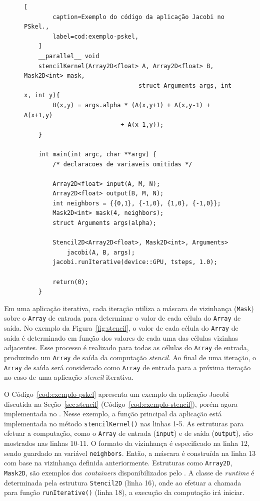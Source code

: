 \begin{figure}[t]
	\begin{lstlisting}[
		caption=Exemplo do código da aplicação Jacobi no PSkel.,
		label=cod:exemplo-pskel,
	]
	__parallel__ void
	stencilKernel(Array2D<float> A, Array2D<float> B, Mask2D<int> mask,
								struct Arguments args, int x, int y){
		B(x,y) = args.alpha * (A(x,y+1) + A(x,y-1) + A(x+1,y)
                           + A(x-1,y));
	}

	int main(int argc, char **argv) {
		/* declaracoes de variaveis omitidas */

		Array2D<float> input(A, M, N);
		Array2D<float> output(B, M, N);
		int neighbors = {{0,1}, {-1,0}, {1,0}, {-1,0}};
		Mask2D<int> mask(4, neighbors);
		struct Arguments args(alpha);

		Stencil2D<Array2D<float>, Mask2D<int>, Arguments>
			jacobi(A, B, args);
		jacobi.runIterative(device::GPU, tsteps, 1.0);

		return(0);
	}
\end{lstlisting}
\end{figure}

Em uma aplicação \stencil iterativa, cada iteração utiliza a máscara de
vizinhança (\texttt{Mask}) sobre o \texttt{Array} de entrada para determinar o
valor de cada célula do \texttt{Array} de saída. No exemplo da
Figura~\ref{fig:stencil}, o valor de cada célula do \texttt{Array} de saída é
determinado em função dos valores de cada uma das células vizinhas adjacentes.
Esse processo é realizado para todas as células do \texttt{Array} de entrada,
produzindo um \texttt{Array} de saída da computação \textit{stencil}. Ao final de uma
iteração, o \texttt{Array} de saída será considerado como \texttt{Array} de
entrada para a próxima iteração no caso de uma aplicação \textit{stencil} iterativa.

O Código~\ref{cod:exemplo-pskel} apresenta um exemplo da aplicação Jacobi discutida na
Seção~\ref{sec:stencil} (Código~\ref{cod:exemplo-stencil}), porém agora implementada no \fw \pskel.
Nesse exemplo, a função \stencil principal da aplicação está implementada no método \texttt{stencilKernel()} nas linhas 1-5.
As estruturas para efetuar a computação, como o \texttt{Array} de entrada (\texttt{input}) e de saída (\texttt{output}), são mostrados nas linhas 10-11.
O formato da vizinhança é especificado na linha 12, sendo guardado na variável \texttt{neighbors}.
Então, a máscara é construída na linha 13 com base na vizinhança definida anteriormente.
Estruturas como \texttt{Array2D}, \texttt{Mask2D}, são exemplos dos
\textit{containers} disponibilizados pelo \fw. A classe de \textit{runtime} é
determinada pela estrutura \texttt{Stencil2D} (linha 16), onde ao efetuar a chamada para
função \texttt{runIterative()} (linha 18), a execução da computação irá iniciar.

